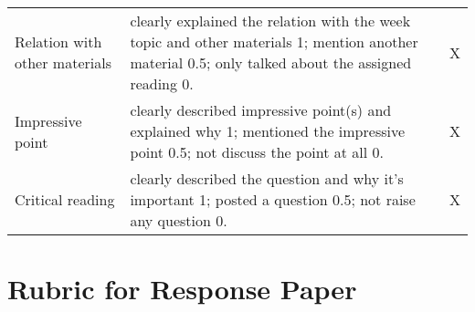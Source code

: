 \documentclass[11pt,]{article}
\theoremstyle{definition}
\theoremstyle{definition}
\theoremstyle{remark}
\begin{document}
\begin{longtable}[]{@{}lll@{}}
\begin{minipage}[t]{0.16\columnwidth}
Relation with other materials\strut
\end{minipage} & \begin{minipage}[t]{0.72\columnwidth}\raggedright\strut
clearly explained the relation with the week topic and other materials
1; mention another material 0.5; only talked about the assigned reading
0.\strut
\end{minipage} & \begin{minipage}[t]{0.04\columnwidth}\raggedright\strut
X\strut
\end{minipage}\tabularnewline
\begin{minipage}[t]{0.16\columnwidth}\raggedright\strut
Impressive point\strut
\end{minipage} & \begin{minipage}[t]{0.72\columnwidth}\raggedright\strut
clearly described impressive point(s) and explained why 1; mentioned the
impressive point 0.5; not discuss the point at all 0.\strut
\end{minipage} & \begin{minipage}[t]{0.04\columnwidth}\raggedright\strut
X\strut
\end{minipage}\tabularnewline
\begin{minipage}[t]{0.16\columnwidth}\raggedright\strut
Critical reading\strut
\end{minipage} & \begin{minipage}[t]{0.72\columnwidth}\raggedright\strut
clearly described the question and why it's important 1; posted a
question 0.5; not raise any question 0.\strut
\end{minipage} & \begin{minipage}[t]{0.04\columnwidth}\raggedright\strut
X\strut
\end{minipage}\tabularnewline
\bottomrule
\end{longtable}

\section{Rubric for Response Paper}\label{rubric-for-response-paper}
\end{document}
